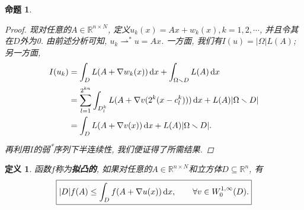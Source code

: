 \documentclass[12pt,a4paper]{article}
\newtheorem{definition}[theorem]{定义}
\newtheorem{proposition}[theorem]{命题}
\begin{document}
\begin{proposition}
\begin{proof}
        现对任意的$A \in \mathbb{R}^{n \times N}$, 定义$u_k(x)= Ax + w_k(x), k = 1, 2, \cdots$, 并且令其在$D$外为0.
        由前述分析可知, $u_k \rightharpoonup^* u = Ax$. 一方面, 我们有$I(u) = |\Omega|L(A)$; 另一方面, 
        \begin{align*}
            I(u_k) &= \int_DL(A + \nabla w_k(x)) \,{\rm d}x + \int_{\Omega\smallsetminus D}L(A) \,{\rm d}x \\ 
            &= \sum_{l = 1}^{2^{kn}}\int_{D^k_l}L(A + \nabla v(2^k(x - c_l^k))) \,{\rm d}x + L(A)|\Omega \smallsetminus D| \\ 
            &= \int_DL(A + \nabla v(x)) \,{\rm d}x + L(A)|\Omega \smallsetminus D|.
        \end{align*}
        再利用$I$的弱\textsuperscript{*}序列下半连续性, 我们便证得了所需结果.
    \end{proof}
\end{proposition}

\begin{definition}
    函数$f$称为\textbf{拟凸的}, 如果对任意的$A \in \mathbb{R}^{n \times N}$和立方体$D \subseteq \mathbb{R}^n$, 有 
    \begin{equation*}
        \boxed{|D|f(A) \leq \int_Df(A + \nabla u(x)) \,{\rm d}x, \qquad \forall v \in W_0^{1, \infty}(D).}
    \end{equation*}
\end{definition}
\end{document}
